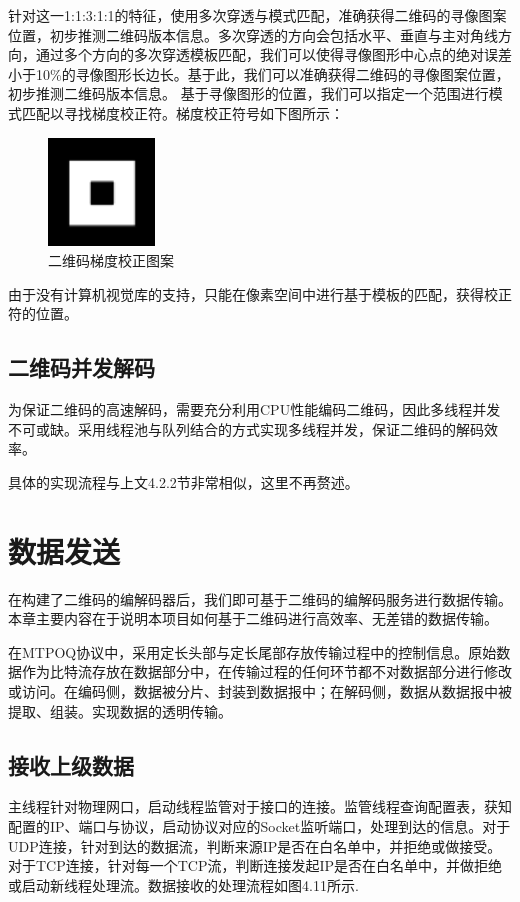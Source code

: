 针对这一1:1:3:1:1的特征，使用多次穿透与模式匹配，准确获得二维码的寻像图案位置，初步推测二维码版本信息。多次穿透的方向会包括水平、垂直与主对角线方向，通过多个方向的多次穿透模板匹配，我们可以使得寻像图形中心点的绝对误差小于10\%的寻像图形长边长。基于此，我们可以准确获得二维码的寻像图案位置，初步推测二维码版本信息。
基于寻像图形的位置，我们可以指定一个范围进行模式匹配以寻找梯度校正符。梯度校正符号如下图所示：

\begin{figure}[!htbp]
\centering
\includegraphics[scale=1]{figures/PAT_s.png}
\caption{二维码梯度校正图案}
\end{figure}

由于没有计算机视觉库的支持，只能在像素空间中进行基于模板的匹配，获得校正符的位置。

\subsection{二维码并发解码}

为保证二维码的高速解码，需要充分利用CPU性能编码二维码，因此多线程并发不可或缺。采用线程池与队列结合的方式实现多线程并发，保证二维码的解码效率。

具体的实现流程与上文4.2.2节非常相似，这里不再赘述。

\section{数据发送}

在构建了二维码的编解码器后，我们即可基于二维码的编解码服务进行数据传输。本章主要内容在于说明本项目如何基于二维码进行高效率、无差错的数据传输。

在MTPOQ协议中，采用定长头部与定长尾部存放传输过程中的控制信息。原始数据作为比特流存放在数据部分中，在传输过程的任何环节都不对数据部分进行修改或访问。在编码侧，数据被分片、封装到数据报中；在解码侧，数据从数据报中被提取、组装。实现数据的透明传输。

\subsection{接收上级数据}

主线程针对物理网口，启动线程监管对于接口的连接。监管线程查询配置表，获知配置的IP、端口与协议，启动协议对应的Socket监听端口，处理到达的信息。对于UDP连接，针对到达的数据流，判断来源IP是否在白名单中，并拒绝或做接受。对于TCP连接，针对每一个TCP流，判断连接发起IP是否在白名单中，并做拒绝或启动新线程处理流。数据接收的处理流程如图4.11所示.

